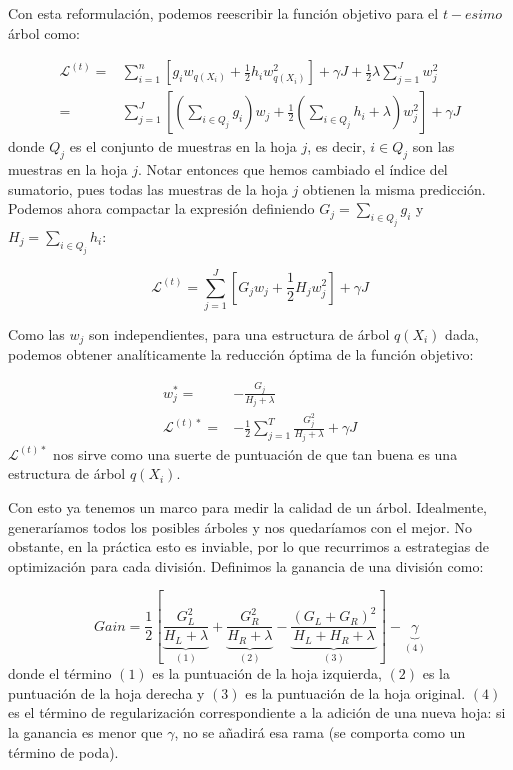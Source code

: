 \documentclass[titlepage, 11pt]{book}
\begin{document}
Con esta reformulación, podemos reescribir la función objetivo para el $t-esimo$ árbol como:

\begin{equation*}
    \begin{aligned}
        \mathcal{L}^{(t)} =& \sum_{i=1}^n \left[g_i w_{q(X_i)}+\frac{1}{2}h_i w_{q(X_i)}^2 \right] + \gamma J + \frac{1}{2} \lambda \sum_{j=1}^J w_j^2\\ =& \sum_{j=1}^J \left[ \left( \sum_{i\in Q_j} g_i \right) w_j+\frac{1}{2} \left( \sum_{i\in Q_j} h_i+\lambda \right) w_j^2 \right] + \gamma J
    \end{aligned}
\end{equation*}
donde $Q_j$ es el conjunto de muestras en la hoja $j$, es decir, $i \in Q_j$ son las muestras en la hoja $j$. Notar entonces que hemos cambiado el índice del sumatorio, pues todas las muestras de la hoja $j$ obtienen la misma predicción. Podemos ahora compactar la expresión definiendo $G_j=\sum_{i \in Q_j}g_i$ y $H_j=\sum_{i \in Q_j}h_i$:

\begin{equation*}
     \mathcal{L}^{(t)} = \sum_{j=1}^J \left[ G_j w_j+\frac{1}{2} H_j w_j^2 \right] + \gamma J
\end{equation*}

Como las $w_j$ son independientes, para una estructura de árbol $q(X_i)$ dada, podemos obtener analíticamente la reducción óptima de la función objetivo:

\begin{equation*}
    \begin{aligned}
        w_j^*=&-\frac{G_j}{H_j+\lambda}\\
        \mathcal{L}^{(t)*}=&-\frac{1}{2}\sum_{j=1}^T\frac{G_j^2}{H_j+\lambda}+\gamma J
    \end{aligned}
\end{equation*}
$\mathcal{L}^{(t)*}$ nos sirve como una suerte de puntuación de que tan buena es una estructura de árbol $q(X_i)$.

Con esto ya tenemos un marco para medir la calidad de un árbol. Idealmente, generaríamos todos los posibles árboles y nos quedaríamos con el mejor. No obstante, en la práctica esto es inviable, por lo que recurrimos a estrategias de optimización para cada división. Definimos la ganancia de una división como:

\begin{equation*}
        Gain=\frac{1}{2}\left[  \underbrace{\frac{G_L^2}{H_L+\lambda}}_{(1)}+\underbrace{\frac{G_R^2}{H_R+\lambda}}_{(2)}-\underbrace{\frac{(G_L+G_R)^2}{H_L+H_R+\lambda}}_{(3)}\right] - \underbrace{\gamma}_{(4)}
\end{equation*}
donde el término $(1)$ es la puntuación de la hoja izquierda, $(2)$ es la puntuación de la hoja derecha y $(3)$ es la puntuación de la hoja original. $(4)$ es el término de regularización correspondiente a la adición de una nueva hoja: si la ganancia es menor que $\gamma$, no se añadirá esa rama (se comporta como un término de poda).
\end{document}
